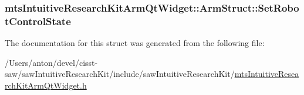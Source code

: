 \subsubsection[{Set\+Robot\+Control\+State}]{ mts\+Intuitive\+Research\+Kit\+Arm\+Qt\+Widget\+::\+Arm\+Struct\+::\+Set\+Robot\+Control\+State}\label{structmts_intuitive_research_kit_arm_qt_widget_1_1_arm_struct_a91a2147d07e6b4e2c578bac2a0250696}


The documentation for this struct was generated from the following file\+:\begin{DoxyCompactItemize}
\item 
/\+Users/anton/devel/cisst-\/saw/saw\+Intuitive\+Research\+Kit/include/saw\+Intuitive\+Research\+Kit/\hyperlink{mts_intuitive_research_kit_arm_qt_widget_8h}{mts\+Intuitive\+Research\+Kit\+Arm\+Qt\+Widget.\+h}\end{DoxyCompactItemize}
